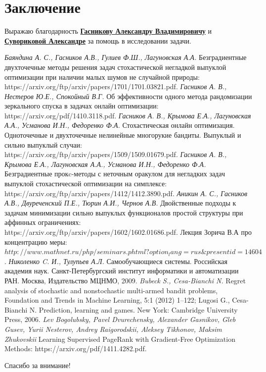 \documentclass[12pt]{article}
\begin{document}
\section{Заключение}
Выражаю благодарность \underline{\textbf{Гасникову Александру Владимировичу}} 
\newline
 и \underline{\textbf{Сувориковой Александре}} за помощь в исследовании задачи.
\begin{thebibliography}{10}
\textit{Баяндина А. С., Гасников А.В., Гулиев Ф.Ш., Лагуновская А.А.} 
Безградиентные двухточечные методы решения задач стохастической 
негладкой выпуклой оптимизации при наличии малых шумов не случайной природы: https://arxiv.org/ftp/arxiv/papers/1701/1701.03821.pdf.
  \textit{Гасников А. В., Нестеров Ю.Е., Спокойный В.Г.} 
Об эффективности одного метода рандомизации зеркального спуска в задачах онлайн оптимизации:
https://arxiv.org/pdf/1410.3118.pdf.
  \textit{Гасников А. В., Крымова Е.А., Лагуновская А.А., Усманова И.Н., Федоренко Ф.А.} 
Стохастическая онлайн оптимизация. 
Одноточечные и двухточечные нелинейные многорукие 
бандиты. Выпуклый и сильно выпуклый случаи:
https://arxiv.org/ftp/arxiv/papers/1509/1509.01679.pdf.
  \textit{Гасников А. В., Крымова Е.А., Лагуновская А.А., Усманова И.Н., Федоренко Ф.А.} 
Безградиентные прокc-методы с неточным оракулом для негладких задач выпуклой стохастической оптимизации на симплексе:
https://arxiv.org/ftp/arxiv/papers/1412/1412.3890.pdf.
  \textit{Аникин А. С., Гасников А.В., Двуреченский П.Е., Тюрин А.И., Чернов А.В.} 
Двойственные подходы к задачам минимизации сильно выпуклых функционалов простой структуры при аффинных ограничениях:
https://arxiv.org/ftp/arxiv/papers/1602/1602.01686.pdf.
 Лекция Зорича В.А про концентрацию меры:
\newline $http://www.mathnet.ru/php/seminars.phtml?option_lang=rus\&presentid=14604$.
 \textit{Николенко C. И., Тулупьев А.Л.} 
Самообучающиеся системы. Российская академия наук. Санкт-Петербургский институт информатики и автоматизации РАН. Москва, Издательство МЦНМО, 2009.
\textit{Bubeck S., Cesa-Bianchi N.} Regret analysis of stochastic and nonstochastic multi-armed bandit problems, Foundation and Trends in Machine Learning, 5:1 (2012) 1–122; Lugosi G., Cesa-Bianchi N. Prediction, learning and games. New York: Cambridge University Press, 2006.
\textit{Lev Bogolubsky, Pavel Dvurechensky, Alexander Gasnikov, Gleb Gusev, Yurii Nesterov, Andrey Raigorodskii, Aleksey Tikhonov, Maksim Zhukovskii} 
Learning Supervised PageRank with Gradient-Free
Optimization Methods:
https://arxiv.org/pdf/1411.4282.pdf.
\end{thebibliography}
\begin{center}
	\begin{Large}
			Спасибо за внимание!
	\end{Large}
\end{center}
\newpage
\end{document}
